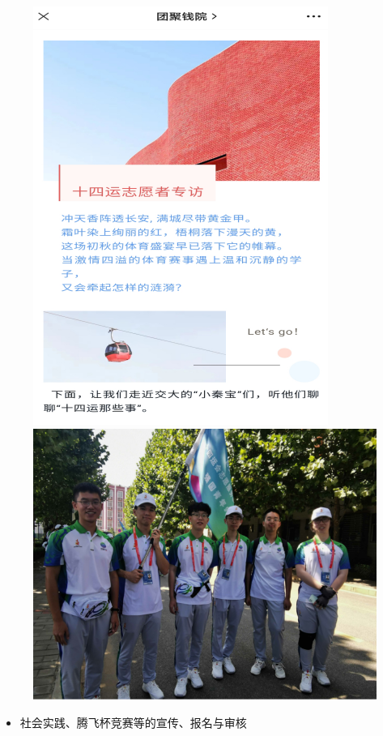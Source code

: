 \documentclass[
decoration,  %
]{qyxf-book}
\begin{document}
		\begin{figure}[H]
			\centering
			\includegraphics[scale=1.4]{pics/sxy1.png}
			\includegraphics[scale=1.4]{pics/sxy2.png}
		\end{figure}
	
	
	\begin{itemize}
		\item 社会实践、腾飞杯竞赛等的宣传、报名与审核
	\end{itemize}
	
\end{document}
